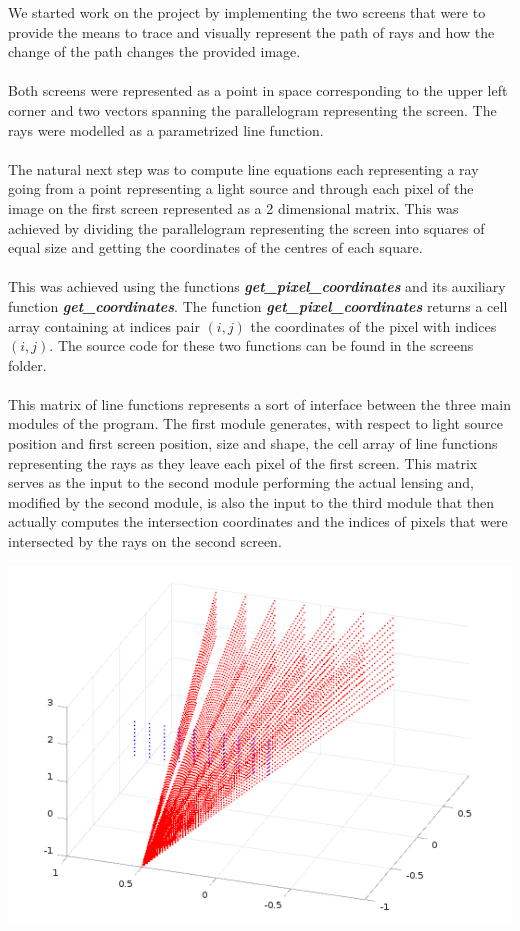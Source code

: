 \documentclass[A4]{article}
\begin{document}
We started work on the project by implementing the two screens that were to provide the means to trace and visually represent the path of rays and how the change of the path changes the provided image. \\\\
Both screens were represented as a point in space corresponding to the upper left corner and two vectors spanning the parallelogram representing the screen. The rays were modelled as a parametrized line function. \\\\
The natural next step was to compute line equations each representing a ray going from a point representing a light source and through each pixel of the image on the first screen represented as a 2 dimensional matrix. This was achieved by dividing the parallelogram representing the screen into squares of equal size and getting the coordinates of the centres of each square. \\\\
This was achieved using the functions \textbf{\textit{get\_pixel\_coordinates}} and its auxiliary function \textbf{\textit{get\_coordinates}}. The function \textbf{\textit{get\_pixel\_coordinates}} returns a cell array containing at indices pair $(i, j)$ the coordinates of the pixel with indices $(i, j)$. The source code for these two functions can be found in the screens folder. \\\\
This matrix of line functions represents a sort of interface between the three main modules of the program. The first module generates, with respect to light source position and first screen position, size and shape, the cell array of line functions representing the rays as they leave each pixel of the first screen. This matrix serves as the input to the second module performing the actual lensing and, modified by the second module, is also the input to the third module that then actually computes the intersection coordinates and the indices of pixels that were intersected by the rays on the second screen.  

\vspace{10mm}

\includegraphics[scale=0.5, inner]{rays1}
\end{document}
